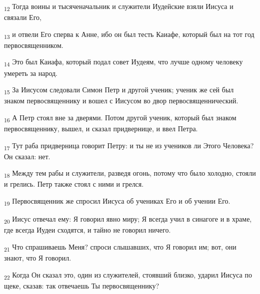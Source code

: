 \begin{tcolorbox}
\textsubscript{12} Тогда воины и тысяченачальник и служители Иудейские взяли Иисуса и связали Его,
\end{tcolorbox}
\begin{tcolorbox}
\textsubscript{13} и отвели Его сперва к Анне, ибо он был тесть Каиафе, который был на тот год первосвященником.
\end{tcolorbox}
\begin{tcolorbox}
\textsubscript{14} Это был Каиафа, который подал совет Иудеям, что лучше одному человеку умереть за народ.
\end{tcolorbox}
\begin{tcolorbox}
\textsubscript{15} За Иисусом следовали Симон Петр и другой ученик; ученик же сей был знаком первосвященнику и вошел с Иисусом во двор первосвященнический.
\end{tcolorbox}
\begin{tcolorbox}
\textsubscript{16} А Петр стоял вне за дверями. Потом другой ученик, который был знаком первосвященнику, вышел, и сказал придвернице, и ввел Петра.
\end{tcolorbox}
\begin{tcolorbox}
\textsubscript{17} Тут раба придверница говорит Петру: и ты не из учеников ли Этого Человека? Он сказал: нет.
\end{tcolorbox}
\begin{tcolorbox}
\textsubscript{18} Между тем рабы и служители, разведя огонь, потому что было холодно, стояли и грелись. Петр также стоял с ними и грелся.
\end{tcolorbox}
\begin{tcolorbox}
\textsubscript{19} Первосвященник же спросил Иисуса об учениках Его и об учении Его.
\end{tcolorbox}
\begin{tcolorbox}
\textsubscript{20} Иисус отвечал ему: Я говорил явно миру; Я всегда учил в синагоге и в храме, где всегда Иудеи сходятся, и тайно не говорил ничего.
\end{tcolorbox}
\begin{tcolorbox}
\textsubscript{21} Что спрашиваешь Меня? спроси слышавших, что Я говорил им; вот, они знают, что Я говорил.
\end{tcolorbox}
\begin{tcolorbox}
\textsubscript{22} Когда Он сказал это, один из служителей, стоявший близко, ударил Иисуса по щеке, сказав: так отвечаешь Ты первосвященнику?
\end{tcolorbox}
